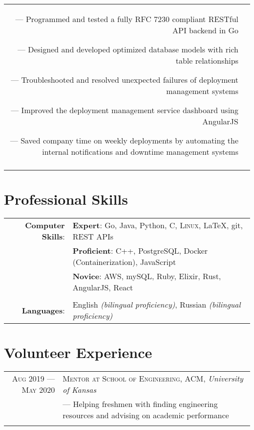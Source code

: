 \documentclass[letterpaper, 10pt]{article}
\begin{document}
\begin{tabular}{r|p{12cm}}
{		--- Programmed and tested a fully RFC 7230 compliant RESTful API backend in Go

		--- Designed and developed optimized database models with rich table relationships

		--- Troubleshooted and resolved unexpected failures of deployment management systems

		--- Improved the deployment management service dashboard using AngularJS

		--- Saved company time on weekly deployments by automating the internal notifications and downtime management systems
	}                                                                                                                            \\\multicolumn{2}{c}{}\\
\end{tabular}

\section{Professional Skills}
\begin{tabular}{rl}
	\textbf{Computer Skills}: &
	\textbf{Expert}: Go, Java, Python, C, \textsc{Linux}, \LaTeX, git, REST APIs                               \\&
	\textbf{Proficient}: C++, PostgreSQL, Docker (Containerization), JavaScript                                \\&
	\textbf{Novice}: AWS, mySQL, Ruby, Elixir, Rust, AngularJS, React                                          \\\\

	\textbf{Languages}:       & English \emph{(bilingual proficiency)}, Russian \emph{(bilingual proficiency)} \\
\end{tabular}

\section{Volunteer Experience}
\begin{tabular}{r|p{12cm}}

	\textsc{Aug 2019 --- May 2020} & \textsc{Mentor at School of Engineering, ACM}, \emph{University of Kansas} \\&\footnotesize{
		--- Helping freshmen with finding engineering resources and advising on academic performance
	}                                                                                                           \\\multicolumn{2}{c}{}\\
\end{tabular}
\end{document}
